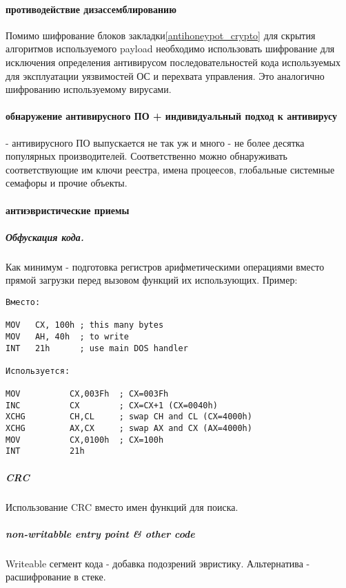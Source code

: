 
\paragraph{противодействие дизассемблированию}

Помимо шифрование блоков закладки\ref{antihoneypot_crypto} для скрытия алгоритмов используемого payload необходимо использовать шифрование для  исключения определения антивирусом последовательностей кода используемых для эксплуатации уязвимостей ОС и перехвата управления. Это аналогично шифрованию используемому вирусами.

\paragraph{обнаружение антивирусного ПО + индивидуальный подход к антивирусу} - антивирусного ПО выпускается не так уж и много - не более десятка популярных производителей. Соответственно можно обнаруживать соответствующие им ключи реестра, имена процеесов, глобальные системные семафоры и прочие объекты.

\paragraph{антиэвристические приемы}

\subparagraph{Обфускация кода.\\} Как минимум - подготовка регистров арифметическими операциями вместо прямой загрузки перед вызовом функций их использующих. Пример:
\begin{verbatim}
Вместо:

MOV   CX, 100h ; this many bytes
MOV   AH, 40h  ; to write
INT   21h      ; use main DOS handler

Используется:

MOV          CX,003Fh  ; CX=003Fh
INC          CX        ; CX=CX+1 (CX=0040h)
XCHG         CH,CL     ; swap CH and CL (CX=4000h)
XCHG         AX,CX     ; swap AX and CX (AX=4000h)
MOV          CX,0100h  ; CX=100h
INT          21h
\end{verbatim}

\subparagraph{CRC\\} Использование CRC вместо имен функций для поиска.

\subparagraph{non-writabble entry point \& other code\\}
Writeable сегмент кода - добавка подозрений эвристику. Альтернатива - расшифрование в стеке.

